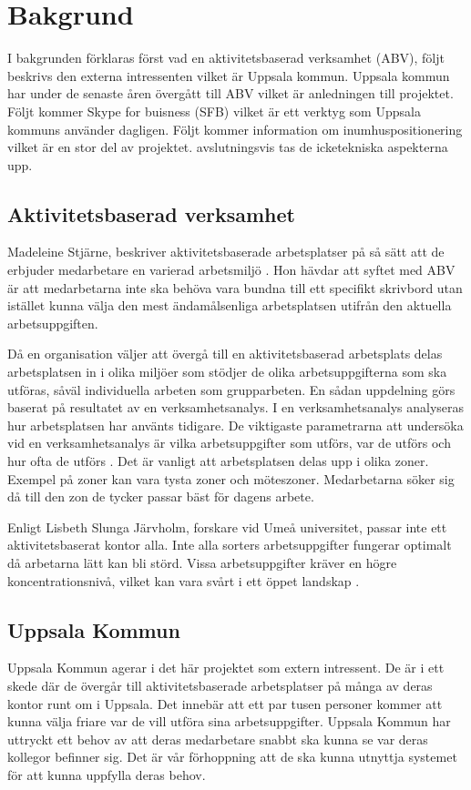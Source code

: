 \documentclass[swedish, a4paper,12pt]{article}
\begin{document}
\section{Bakgrund}
I bakgrunden förklaras först vad en aktivitetsbaserad verksamhet (ABV), följt beskrivs den externa intressenten vilket är Uppsala kommun. Uppsala kommun har under de senaste åren övergått till ABV vilket är anledningen till projektet. Följt kommer Skype for buisness (SFB) vilket är ett verktyg som Uppsala kommuns använder dagligen. Följt kommer information om inumhuspositionering vilket är en stor del av projektet. avslutningsvis tas de icketekniska aspekterna upp.

\subsection{Aktivitetsbaserad verksamhet}
Madeleine Stjärne, beskriver aktivitetsbaserade arbetsplatser på så sätt att de erbjuder medarbetare en varierad arbetsmiljö \cite{ABV}. Hon hävdar att syftet med ABV är att medarbetarna inte ska behöva vara bundna till ett specifikt skrivbord utan istället kunna välja den mest ändamålsenliga arbetsplatsen utifrån den aktuella arbetsuppgiften. %

Då en organisation väljer att övergå till en aktivitetsbaserad arbetsplats
delas arbetsplatsen in i olika miljöer som stödjer de olika arbetsuppgifterna som ska utföras, såväl individuella arbeten som grupparbeten. En sådan uppdelning görs baserat på resultatet av en verksamhetsanalys. I en verksamhetsanalys analyseras hur arbetsplatsen har använts tidigare. De viktigaste parametrarna att undersöka vid en verksamhetsanalys är vilka arbetsuppgifter som utförs, var de utförs och hur ofta de utförs \cite{ABV}.
Det är vanligt att arbetsplatsen delas upp i olika zoner. Exempel på zoner kan vara tysta zoner och möteszoner. Medarbetarna söker sig då till den zon de tycker passar bäst för dagens arbete.

Enligt Lisbeth Slunga Järvholm, forskare vid Umeå universitet, passar inte ett aktivitetsbaserat kontor alla. Inte alla sorters arbetsuppgifter fungerar optimalt då arbetarna lätt kan bli störd. Vissa arbetsuppgifter kräver en högre koncentrationsnivå, vilket kan vara svårt i ett öppet landskap \cite{passarInteAlla}.

\subsection{Uppsala Kommun}
Uppsala Kommun agerar i det här projektet som extern intressent. De är i ett skede där de övergår till aktivitetsbaserade arbetsplatser på många av deras kontor runt om i Uppsala. Det innebär att %
ett par tusen personer kommer att kunna välja friare var de vill utföra sina arbetsuppgifter. Uppsala Kommun har uttryckt ett behov av att deras medarbetare snabbt ska kunna se var deras kollegor befinner sig. Det är vår förhoppning att de ska kunna utnyttja systemet för att kunna uppfylla deras behov.
\end{document}
